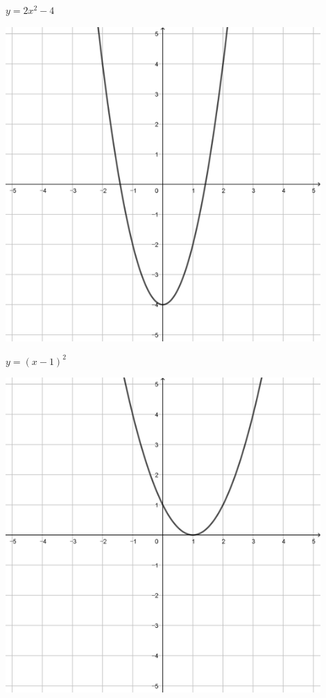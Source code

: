 \documentclass[a4paper]{oblivoir}
\begin{document}
\begin{minipage}{0.45\textwidth}\centering
\(y=2x^2-4\)
\par\bigskip\includegraphics[width=0.9\textwidth]{img/2_quadratic_13}
\end{minipage}
\begin{minipage}{0.45\textwidth}\centering
\(y=(x-1)^2\)
\par\bigskip\includegraphics[width=0.9\textwidth]{img/2_quadratic_14}
\end{minipage}\bigskip\bigskip\par
\end{document}
